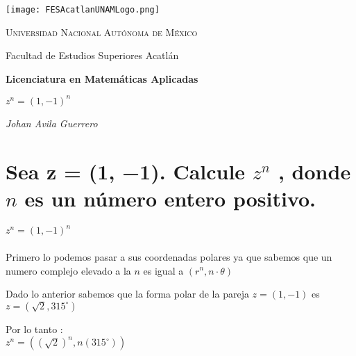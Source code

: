 \documentclass[a4paper,12pt]{article}
\begin{document}
\begin{titlepage}
    \centering
    \texttt{[image: FESAcatlanUNAMLogo.png]} %
    \vspace{1cm}
    
    {\scshape\large Universidad Nacional Autónoma de México \par}
    {\large Facultad de Estudios Superiores Acatlán \par}
    \vspace{1.5cm}
    
    {\Large\bfseries Licenciatura en Matemáticas Aplicadas \par}
    \vspace{2cm}
    
    {\Huge\bfseries  \(z^{n} = (1, -1)^{n} \)  \par}
    \vspace{2cm}
    
    {\Large\itshape Johan Avila Guerrero \par}
    \vfill
    
    
    \vfill
    
\end{titlepage}



\section*{Sea z = (1, −1). Calcule \(z^n\) , donde  \(n\) es un número entero positivo.}
\noindent \(z^n=(1, -1)^n  \)   \\ \\
Primero lo podemos pasar a sus coordenadas polares ya que sabemos que un numero complejo elevado a la \(n\) es igual a \((r^n, n \cdot \theta)\)


Dado lo anterior sabemos que la forma polar de la pareja \( z = (1, -1)\) es \( z = (\sqrt{2}, 315^\circ)\)

Por lo tanto : \\

\(z^n = ((\sqrt{2})^n, n(315^\circ))\)
\end{document}
